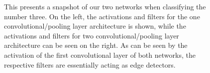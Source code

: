 \documentclass[10pt,twocolumn,letterpaper]{article}
\begin{document}
\begin{figure}
  \caption{This presents a snapshot of our two networks when classifying the number three. On the left, the activations and filters for the one convolutional/pooling layer
  architecture is shown, while the activations and filters for two convolutional/pooling layer architecture can be seen on the right. As can be seen by the activation of the 
  first convolutional layer of both networks, the respective filters are essentially acting as edge detectors.}
  \label{fig:actfilts}
\end{figure}

{\small


}
\end{document}
